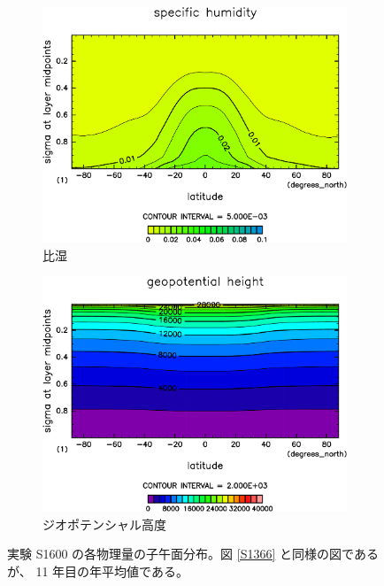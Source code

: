 \documentclass[body]{subfiles}
\begin{document}
\begin{figure}[t]
\begin{subfigure}{.4\textwidth}
		\includegraphics[width=\textwidth]{S1600/QH2OVap,time=3650:4015-crop-rotate.pdf}
		\caption{比湿\hmu*{[kg/kg]}}\label{S1600比湿}
	\end{subfigure}
	\begin{subfigure}{.4\textwidth}
		\centering
		\includegraphics[width=\textwidth]{S1600/Height,time=3650:4015-crop-rotate.pdf}
		\caption{ジオポテンシャル高度\hmu*{[m]}}\label{S1600ジオポテンシャル高度}
	\end{subfigure}
	\caption[実験 S1600 の各物理量の子午面分布]{
		実験 S1600 の各物理量の子午面分布。図 \ref{S1366} と同様の図であるが、
		11 年目の年平均値である。
	}\label{S1600}
\end{figure}
\end{document}
